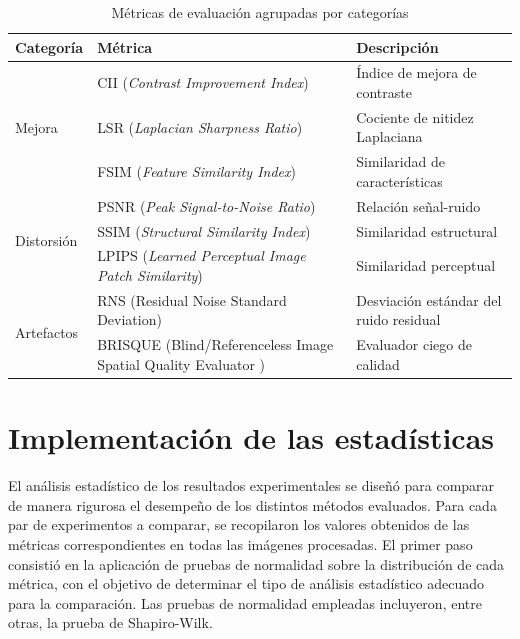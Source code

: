 \begin{table}[h]
    \centering
    \caption{Métricas de evaluación agrupadas por categorías\cite{Metrics}}
    \label{tab:metricas}
    \begin{tabular}{p{3cm}p{8cm}p{3cm}}
    \toprule
    \textbf{Categoría} & \textbf{Métrica} & \textbf{Descripción} \\ 
    \midrule
    \multirow{3}{*}{Mejora} 
    & CII (\textit{Contrast Improvement Index}) & Índice de mejora de contraste \\
    & LSR (\textit{Laplacian Sharpness Ratio}) & Cociente de nitidez Laplaciana \\
    & FSIM (\textit{Feature Similarity Index}) & Similaridad de características \\
    \midrule

    \multirow{3}{*}{Distorsión}
    & PSNR (\textit{Peak Signal-to-Noise Ratio}) & Relación señal-ruido \\
    & SSIM (\textit{Structural Similarity Index}) & Similaridad estructural \\
    & LPIPS (\textit{Learned Perceptual Image Patch Similarity}) & Similaridad perceptual \\
    \midrule

    \multirow{2}{*}{Artefactos}
    & RNS (Residual Noise Standard Deviation) & Desviación estándar del ruido residual \\
    & BRISQUE (Blind/Referenceless Image Spatial Quality Evaluator \cite{BRISQUE}) & Evaluador ciego de calidad \\
    \bottomrule
    \end{tabular}
\end{table}

\section{Implementación de las estadísticas}\label{section:statistics-implementation}

El análisis estadístico de los resultados experimentales se diseñó para comparar de manera rigurosa el desempeño de los distintos métodos evaluados. Para cada par de experimentos a comparar, se recopilaron los valores obtenidos de las métricas correspondientes en todas las imágenes procesadas. El primer paso consistió en la aplicación de pruebas de normalidad sobre la distribución de cada métrica, con el objetivo de determinar el tipo de análisis estadístico adecuado para la comparación. Las pruebas de normalidad empleadas incluyeron, entre otras, la prueba de Shapiro-Wilk.

